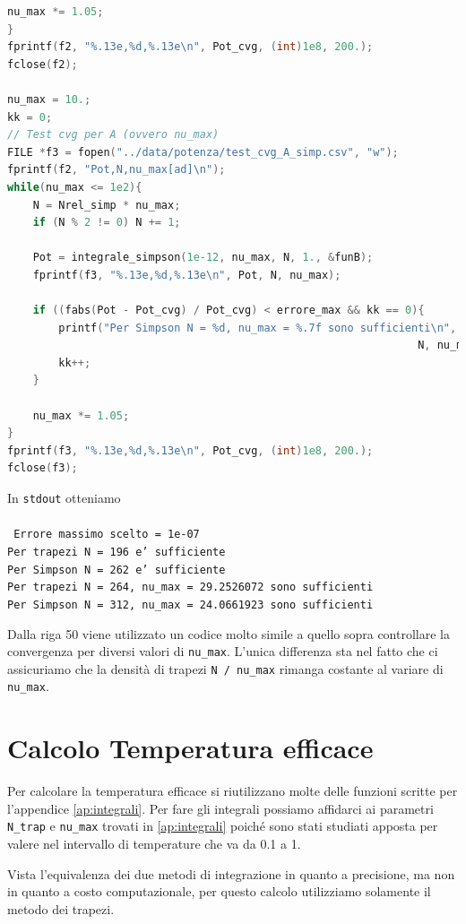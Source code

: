 \documentclass[a4paper, titlepage]{article}
\begin{document}
\begin{lstlisting}[language=C]
    nu_max *= 1.05;
}
fprintf(f2, "%.13e,%d,%.13e\n", Pot_cvg, (int)1e8, 200.);
fclose(f2);

nu_max = 10.;
kk = 0;
// Test cvg per A (ovvero nu_max)
FILE *f3 = fopen("../data/potenza/test_cvg_A_simp.csv", "w");
fprintf(f2, "Pot,N,nu_max[ad]\n");
while(nu_max <= 1e2){
    N = Nrel_simp * nu_max;
    if (N % 2 != 0) N += 1;

    Pot = integrale_simpson(1e-12, nu_max, N, 1., &funB);
    fprintf(f3, "%.13e,%d,%.13e\n", Pot, N, nu_max);

    if ((fabs(Pot - Pot_cvg) / Pot_cvg) < errore_max && kk == 0){
        printf("Per Simpson N = %d, nu_max = %.7f sono sufficienti\n",
                                                                N, nu_max);
        kk++;
    }

    nu_max *= 1.05;
}
fprintf(f3, "%.13e,%d,%.13e\n", Pot_cvg, (int)1e8, 200.);
fclose(f3);
\end{lstlisting}

In \texttt{stdout} otteniamo \\ \\
\texttt{
Errore massimo scelto = 1e-07 \\
Per trapezi N = 196 e' sufficiente \\
Per Simpson N = 262 e' sufficiente \\
Per trapezi N = 264, nu\_max = 29.2526072 sono sufficienti \\
Per Simpson N = 312, nu\_max = 24.0661923 sono sufficienti \\
}

Dalla riga 50 viene utilizzato un codice molto simile a quello sopra controllare
la convergenza per diversi valori di \texttt{nu\_max}.
L'unica differenza sta nel fatto che ci assicuriamo che la densità di trapezi
\texttt{N / nu\_max} rimanga costante al variare di \texttt{nu\_max}.


\section{Calcolo Temperatura efficace} \label{ap:Teff}

Per calcolare la temperatura efficace si riutilizzano molte delle funzioni
scritte per l'appendice \ref{ap:integrali}.
Per fare gli integrali possiamo affidarci ai parametri \texttt{N\_trap} e
\texttt{nu\_max} trovati in \ref{ap:integrali} poiché sono stati studiati
apposta per valere nel intervallo di temperature che va da 0.1 a 1.

Vista l'equivalenza dei due metodi di integrazione in quanto a precisione, ma
non in quanto a costo computazionale, per questo calcolo utilizziamo solamente
il metodo dei trapezi.
\end{document}
